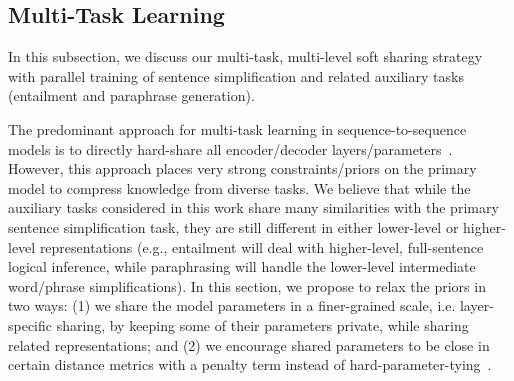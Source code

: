 \documentclass[11pt]{article}
\begin{document}
\subsection{Multi-Task Learning}
\label{subsec:multi-level-sharing-mechanism}
In this subsection, we discuss our multi-task, multi-level soft sharing strategy with parallel training of sentence simplification and related auxiliary tasks (entailment and paraphrase generation). 

The predominant approach for multi-task learning in sequence-to-sequence models is to directly hard-share all encoder/decoder layers/parameters~\cite{luong2015multi,johnson2016google,pasunuru2017multitask,kaiser2017one}. However, this approach places very strong constraints/priors on the primary model to compress knowledge from diverse tasks. We believe that while the auxiliary tasks considered in this work share many similarities with the primary sentence simplification task, they are still different in either lower-level or higher-level representations (e.g., entailment will deal with higher-level, full-sentence logical inference, while paraphrasing will handle the lower-level intermediate word/phrase simplifications). 
In this section, we propose to relax the priors in two ways: (1) we share the model parameters in a finer-grained scale, i.e. layer-specific sharing, by keeping some of their parameters private, while sharing related representations; and (2) we encourage shared parameters to be close in certain distance metrics with a penalty term instead of hard-parameter-tying~\cite{luong2015multi}.
\end{document}
